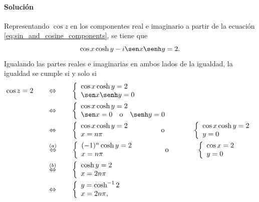 \documentclass[a4paper]{report}
\begin{document}
\paragraph{Solución} Representando \(\cos z\) en los componentes real e imaginario a partir de la ecuación \ref{eq:sin_and_cosine_components}, se tiene que 
\[
 \cos x\cosh y-i\sen x\senh y=2.
\]
Igualando las partes reales e imaginarias en ambos lados de la igualdad, la igualdad se cumple si y solo si
\begin{align*}
 \cos z=2
 \qquad&\Leftrightarrow\qquad
  \left\{ 
  \begin{array}{l}
   \cos x\cosh y=2\\
   \sen x\senh y=0
  \end{array}\right.\\
 \qquad&\Leftrightarrow\qquad
  \left\{ 
  \begin{array}{l}
   \cos x\cosh y=2\\
   \sen x=0\quad\textrm{o}\quad\senh y=0
  \end{array}\right.\\
  \qquad&\Leftrightarrow\qquad
  \left\{ 
  \begin{array}{l}
   \cos x\cosh y=2\\
   x=n\pi
  \end{array}\right.
  \qquad\qquad\textrm{o}\qquad\qquad
  \left\{ 
  \begin{array}{l}
   \cos x\cosh y=2\\
   y=0
  \end{array}\right.\\
  \qquad&\overset{(a)}{\Leftrightarrow}\qquad
  \left\{ 
  \begin{array}{l}
   (-1)^n\cosh y=2\\
   x=n\pi
  \end{array}\right.
  \qquad\qquad\textrm{o}\qquad\qquad
  \left\{ 
  \begin{array}{l}
   \cos x=2\\
   y=0
  \end{array}\right.\\
  \qquad&\overset{(b)}{\Leftrightarrow}\qquad
  \left\{ 
  \begin{array}{l}
   \cosh y=2\\
   x=2n\pi
  \end{array}\right.\\
  \qquad&\Leftrightarrow\qquad
  \left\{ 
  \begin{array}{l}
   y=\cosh^{-1}2\\
   x=2n\pi,
  \end{array}\right.
\end{align*}
\end{document}

